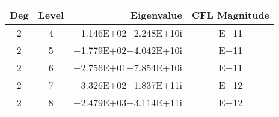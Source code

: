 \documentclass[a4paper]{article}
\begin{document}
\begin{table}
\begin{tabular}{c|c|r|c}
\toprule
\hline
Deg&Level &Eigenvalue&CFL Magnitude \\ \hline\hline
2&4&$-$1.146E$+$02$+$2.248E+10i&E$-$11\\
2&5&$-$1.779E$+$02$+$4.042E+10i&E$-$11\\
2&6&$-$2.756E$+$01$+$7.854E+10i&E$-$11\\
2&7&$-$3.326E$+$02$+$1.837E+11i&E$-$12\\
2&8&$-$2.479E$+$03$-$3.114E+11i&E$-$12\\ \hline
\bottomrule
\end{tabular}
\end{table}
\end{document}

